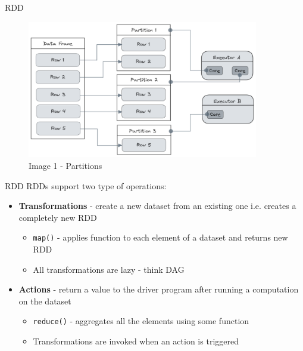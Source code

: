 \documentclass{beamer}
\begin{document}
\begin{frame}{RDD}
	\begin{center}
		\begin{figure}
			\includegraphics[height=6cm]{spark-data-partitions.png}	
			\caption{Image 1 - Partitions}
		\end{figure}
	\end{center}
\end{frame}

\begin{frame}[t]{RDD}
	RDDs support two type of operations:
	\begin{itemize}
		\item<1-> \textbf{Transformations} - create a new dataset from an existing one i.e. creates a completely new RDD
		\begin{itemize}
			\item<2-> \texttt{map()} - applies function to each element of a dataset and returns new RDD
			\item<3-> All transformations are lazy - think DAG
		\end{itemize}
		\item<3-> \textbf{Actions} - return a value to the driver program after running a computation on the dataset
		\begin{itemize}
			\item<4-> \texttt{reduce()} - aggregates all the elements using some function
			\item<5-> Transformations are invoked when an action is triggered
		\end{itemize}
	\end{itemize}
\end{frame}
\end{document}
